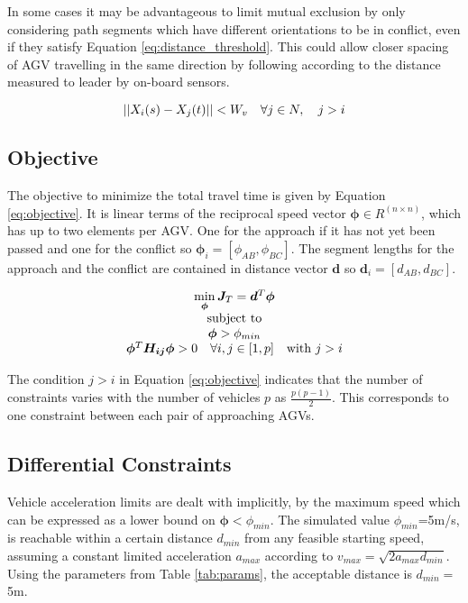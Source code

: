 In some cases it may be advantageous to limit mutual exclusion by only considering path segments which have different orientations to be in conflict, even if they satisfy Equation \ref{eq:distance_threshold}. This could allow closer spacing of AGV travelling in the same direction by following according to the distance measured to leader by on-board sensors.

\begin{equation}
	\label{eq:distance_threshold}
	||X_i(s) - X_j(t)|| < W_v \quad \forall j \in N, \quad j>i\\
\end{equation}

\subsection{Objective}
The objective to minimize the total travel time is given by Equation \ref{eq:objective}. It is linear terms of the reciprocal speed vector $\bm{\phi} \in R^{(n \times n)}$, which has up to two elements per AGV. One for the approach if it has not yet been passed and one for the conflict so $\bm{\phi}_i = [\phi_{AB}, \phi_{BC}]$. The segment lengths for the approach and the conflict are contained in distance vector $\bm{d}$ so $\bm{d}_i =[d_{AB}, d_{BC}] $.

\begin{equation}
	\label{eq:objective}
	\begin{array}{c}
		\min \limits_{\bm{\phi}} \bm{J}_T = \bm{d}^T\bm{\phi} \\ 
		$subject to$\\
		\bm{\phi} > \phi_{min} \\
		\bm{\phi}^T \bm{H_{ij}} \bm{\phi} > 0 \quad \forall i, j \in [1,p] \quad $with $ j > i \\
	\end{array}
\end{equation}

The condition $j > i$ in Equation \ref{eq:objective} indicates that the number of constraints varies with the number of vehicles $p$ as $\frac{p(p-1)}{2}$. This corresponds to one constraint between each pair of approaching AGVs.

\subsection{Differential Constraints}
Vehicle acceleration limits are dealt with implicitly, by the maximum speed which can be expressed as a lower bound on $\bm{\phi} < \phi_{min}$. The simulated value $\phi_{min}$=5m/s, is reachable within a certain distance $d_{min}$ from any feasible starting speed, assuming a constant limited acceleration $a_{max}$ according to $v_{max} = \sqrt{2 a_{max} d_{min}} $. Using the parameters from Table \ref{tab:params}, the acceptable distance is $d_{min}=$5m.


